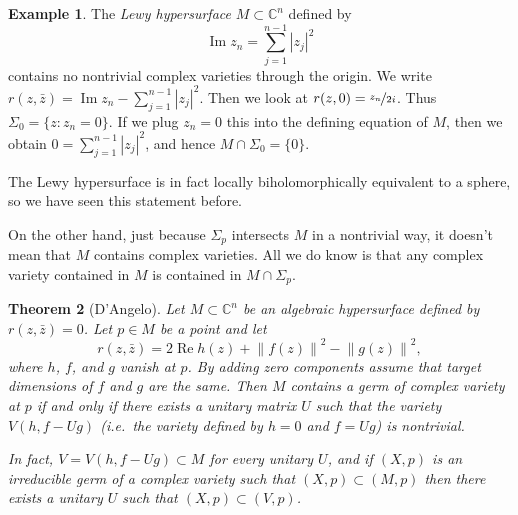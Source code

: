 \documentclass[12pt,openany]{book}
\renewcommand{\Re}{\operatorname{Re}}
\renewcommand{\Im}{\operatorname{Im}}
\newcommand{\abs}[1]{\left\lvert {#1} \right\rvert}
\newcommand{\norm}[1]{\left\lVert {#1} \right\rVert}
\newcommand{\C}{{\mathbb{C}}}
\newcommand{\myindex}[1]{#1\index{#1}}
\theoremstyle{plain}
\newtheorem{thm}{Theorem}[section]
\theoremstyle{remark}
\theoremstyle{definition}
\theoremstyle{exercise}
\theoremstyle{example}
\newtheorem{example}[thm]{Example}
\begin{document}
\begin{example}
The \emph{\myindex{Lewy hypersurface}} $M \subset \C^n$ defined by
\begin{equation}
\Im z_n = \sum_{j=1}^{n-1} \abs{z_j}^2
\end{equation}
contains no nontrivial complex varieties through the origin.
We write
$r(z,\bar{z}) = \Im z_n - \sum_{j=1}^{n-1} \abs{z_j}^2$.  Then we look
at $r(z,0) = \nicefrac{z_n}{2i}$.  Thus
$\Sigma_0 = \{ z : z_n = 0 \}$.  If we plug $z_n = 0$
this into the defining equation of $M$,
then we obtain
$0 = \sum_{j=1}^{n-1} \abs{z_j}^2$, and hence $M \cap \Sigma_0 = \{ 0 \}$.

The Lewy hypersurface is in fact locally biholomorphically
equivalent to a sphere, so we have seen this statement
before.
\end{example}

On the other hand, just because $\Sigma_p$ intersects $M$ in a nontrivial
way,
it
doesn't mean that $M$ contains complex varieties.  All we do know is that 
any complex variety contained in $M$ is contained in $M \cap
\Sigma_p$.

\begin{thm}[D'Angelo] \label{theorem:algcplxinm}
Let $M \subset \C^n$ be an algebraic hypersurface defined by $r(z,\bar{z}) =
0$.  Let $p \in M$ be a point and let
\begin{equation}
r(z,\bar{z}) = 2 \Re h(z) + \norm{f(z)}^2-\norm{g(z)}^2 ,
\end{equation}
where $h$, $f$, and $g$ vanish at $p$.  By adding zero components
assume that target dimensions of $f$ and $g$ are the same.
Then $M$ contains a germ of complex
variety at $p$
if and only if there exists a unitary matrix $U$ such that
the variety $V(h,f-Ug)$ (i.e.\ the variety defined by $h=0$ and $f=Ug$)
is nontrivial.

In fact, $V=V(h,f-Ug) \subset M$ for every unitary $U$, and if $(X,p)$
is an irreducible germ of a complex variety such that $(X,p) \subset (M,p)$
then there exists a unitary $U$ such that $(X,p) \subset (V,p)$.
\end{thm}
\end{document}
